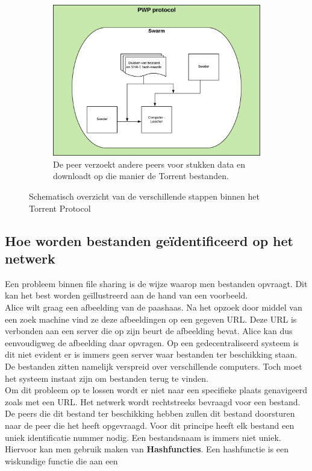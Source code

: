 \begin{figure}[h!]
\begin{subfigure}{1\textwidth}
		\includegraphics[scale=0.6]{torrent-3.png}
	\caption[PWP stap]{De peer verzoekt andere peers voor stukken data en downloadt op die manier de Torrent bestanden.}
	\end{subfigure}
	
	\caption[Overzicht Torrent Protocol]{Schematisch overzicht van de verschillende stappen binnen het Torrent Protocol}\label{fig_types_cvs}
\end{figure}
\newpage

\subsection{Hoe worden bestanden geïdentificeerd op het netwerk}
Een probleem binnen file sharing is de wijze waarop men bestanden opvraagt. Dit kan het best worden geïllustreerd aan de hand van een voorbeeld.\\

Alice wilt graag een afbeelding van de paashaas. Na het opzoek door middel van een zoek machine vind ze deze afbeeldingen op een gegeven URL. Deze URL is verbonden aan een server die op zijn beurt de afbeelding bevat. Alice kan dus eenvoudigweg de afbeelding daar opvragen. Op een gedecentraliseerd systeem is dit niet evident er is immers geen server waar bestanden ter beschikking staan. De bestanden zitten namelijk verspreid over verschillende computers. Toch moet het systeem instaat zijn om bestanden terug te vinden.\\

Om dit probleem op te lossen wordt er niet naar een specifieke plaats genavigeerd zoals met een URL. Het netwerk wordt rechtstreeks bevraagd voor een bestand. De peers die dit bestand ter beschikking hebben zullen dit bestand doorsturen naar de peer die het heeft opgevraagd. Voor dit principe heeft elk bestand een uniek identificatie nummer nodig. Een bestandsnaam is immers niet uniek.\\

Hiervoor kan men gebruik maken van \textbf{Hashfuncties}. Een hashfunctie is een wiskundige functie die aan een

